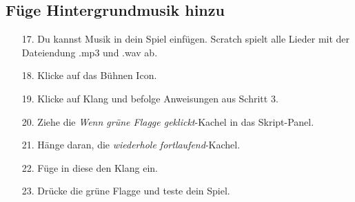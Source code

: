 \subsection{Füge Hintergrundmusik hinzu}
\begin{itemize}
\item[17.] Du kannst Musik in dein Spiel einfügen. Scratch spielt alle Lieder mit der Dateiendung .mp3 und .wav ab.
\item[18.] Klicke auf das Bühnen Icon.
\item[19.] Klicke auf Klang und befolge Anweisungen aus Schritt 3.
\item[20.] Ziehe die \textit{Wenn grüne Flagge geklickt}-Kachel in das Skript-Panel.
\item[21.] Hänge daran, die \textit{wiederhole fortlaufend}-Kachel.
\item[22.] Füge in diese den Klang ein.
\item[23.] Drücke die grüne Flagge und teste dein Spiel.
\end{itemize}